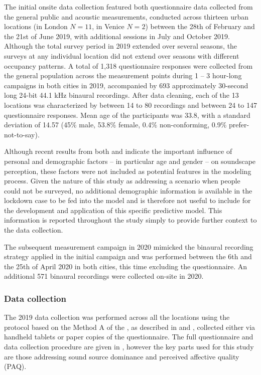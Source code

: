 \documentclass[
  authoryear,
  preprint,
  3p,
  onecolumn]{elsarticle}
\begin{document}
The initial onsite data collection featured both questionnaire data
collected from the general public and acoustic measurements, conducted
across thirteen urban locations (in London \(N=11\), in Venice \(N=2\))
between the 28th of February and the 21st of June 2019, with additional
sessions in July and October 2019. Although the total survey period in
2019 extended over several seasons, the surveys at any individual
location did not extend over seasons with different occupancy patterns.
A total of 1,318 questionnaire responses were collected from the general
population across the measurement points during 1 -- 3 hour-long
campaigns in both cities in 2019, accompanied by 693 approximately
30-second long 24-bit 44.1 kHz binaural recordings. After data cleaning,
each of the 13 locations was characterized by between 14 to 80
recordings and between 24 to 147 questionnaire responses. Mean age of
the participants was 33.8, with a standard deviation of 14.57 (45\%
male, 53.8\% female, 0.4\% non-conforming, 0.9\% prefer-not-to-say).

Although recent results from both \citet{Tarlao2020Investigating} and
\citet{Erfanian2021Psychological} indicate the important influence of
personal and demographic factors -- in particular age and gender -- on
soundscape perception, these factors were not included as potential
features in the modeling process. Given the nature of this study as
addressing a scenario when people could not be surveyed, no additional
demographic information is available in the lockdown case to be fed into
the model and is therefore not useful to include for the development and
application of this specific predictive model. This information is
reported throughout the study simply to provide further context to the
data collection.

The subsequent measurement campaign in 2020 mimicked the binaural
recording strategy applied in the initial campaign and was performed
between the 6th and the 25th of April 2020 in both cities, this time
excluding the questionnaire. An additional 571 binaural recordings were
collected on-site in 2020.

\subsubsection{Data collection}\label{data-collection}

The 2019 data collection was performed across all the locations using
the protocol based on the Method A of the \citet{ISO12913Part2}, as
described in \citet{Aletta2020Assessing} and
\citet{Mitchell2020Soundscape}, collected either via handheld tablets or
paper copies of the questionnaire. The full questionnaire and data
collection procedure are given in \citet{Mitchell2020Soundscape},
however the key parts used for this study are those addressing sound
source dominance and perceived affective quality (PAQ).
\end{document}
